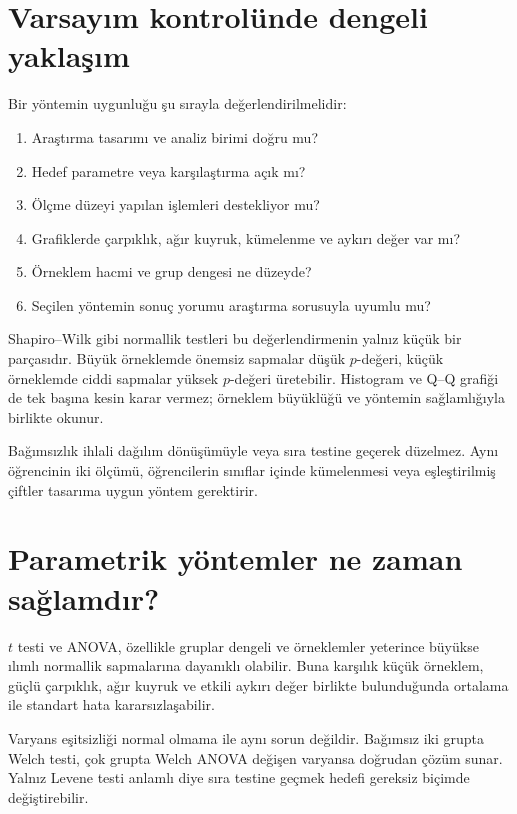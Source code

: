\section{Varsayım kontrolünde dengeli yaklaşım}

Bir yöntemin uygunluğu şu sırayla değerlendirilmelidir:

\begin{enumerate}
  \item Araştırma tasarımı ve analiz birimi doğru mu?
  \item Hedef parametre veya karşılaştırma açık mı?
  \item Ölçme düzeyi yapılan işlemleri destekliyor mu?
  \item Grafiklerde çarpıklık, ağır kuyruk, kümelenme ve aykırı değer var mı?
  \item Örneklem hacmi ve grup dengesi ne düzeyde?
  \item Seçilen yöntemin sonuç yorumu araştırma sorusuyla uyumlu mu?
\end{enumerate}

Shapiro--Wilk gibi normallik testleri bu değerlendirmenin yalnız küçük bir
parçasıdır. Büyük örneklemde önemsiz sapmalar düşük $p$-değeri, küçük örneklemde
ciddi sapmalar yüksek $p$-değeri üretebilir. Histogram ve Q--Q grafiği de tek
başına kesin karar vermez; örneklem büyüklüğü ve yöntemin sağlamlığıyla birlikte
okunur.

\begin{assumptionbox}
Bağımsızlık ihlali dağılım dönüşümüyle veya sıra testine geçerek düzelmez.
Aynı öğrencinin iki ölçümü, öğrencilerin sınıflar içinde kümelenmesi veya
eşleştirilmiş çiftler tasarıma uygun yöntem gerektirir.
\end{assumptionbox}

\section{Parametrik yöntemler ne zaman sağlamdır?}

$t$ testi ve ANOVA, özellikle gruplar dengeli ve örneklemler yeterince büyükse
ılımlı normallik sapmalarına dayanıklı olabilir. Buna karşılık küçük örneklem,
güçlü çarpıklık, ağır kuyruk ve etkili aykırı değer birlikte bulunduğunda
ortalama ile standart hata kararsızlaşabilir.

Varyans eşitsizliği normal olmama ile aynı sorun değildir. Bağımsız iki grupta
Welch testi, çok grupta Welch ANOVA değişen varyansa doğrudan çözüm sunar.
Yalnız Levene testi anlamlı diye sıra testine geçmek hedefi gereksiz biçimde
değiştirebilir.

